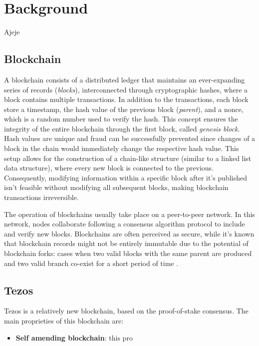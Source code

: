 \chapter{Background}

Ajeje

\section{Blockchain}

A blockchain consists of a distributed ledger that maintains an ever-expanding series of records (\textit{blocks}), interconnected through cryptographic hashes, where a block contains multiple transactions. In addition to the transactions, each block store a timestamp, the hash value of the previous block (\textit{parent}), and a nonce, which is a random number used to verify the hash. This concept ensures the integrity of the entire blockchain through the first block, called \textit{genesis block}. Hash values are unique and fraud can be successfully prevented since changes of a block in the chain would immediately change the respective hash value. This setup allows for the construction of a chain-like structure (similar to a linked list data structure), where every new block is connected to the previous. Consequently, modifying information within a specific block after it's published isn't feasible without modifying all subsequent blocks, making blockchain transactions irreversible. \cite{nofer_blockchain_2017}

The operation of blockchains usually take place on a peer-to-peer network. In this network, nodes collaborate following a consensus algorithm protocol to include and verify new blocks. Blockchains are often perceived as secure, while it's known that blockchain records might not be entirely immutable due to the potential of blockchain forks: cases when two valid blocks with the same parent are produced and two valid branch co-exist for a short period of time \cite{goldberg_short_2019}.

\section{Tezos}

Tezos \cite{allombert_introduction_2019} is a relatively new blockchain, based on the proof-of-stake consensus. The main proprieties of this blockchain are:
\begin{itemize}
      \vspace{-0.11in}
      \item \textbf{Self amending blockchain}: this pro
\end{itemize}

